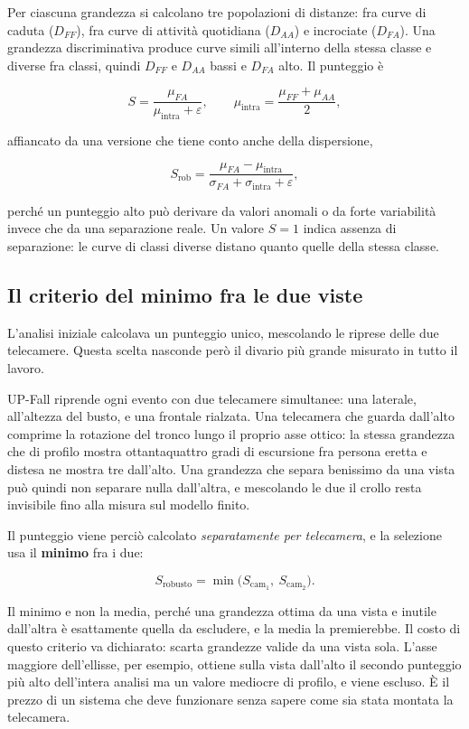 Per ciascuna grandezza si calcolano tre popolazioni di distanze: fra curve di
caduta ($D_{FF}$), fra curve di attività quotidiana ($D_{AA}$) e incrociate
($D_{FA}$). Una grandezza discriminativa produce curve simili all'interno della
stessa classe e diverse fra classi, quindi $D_{FF}$ e $D_{AA}$ bassi e $D_{FA}$
alto. Il punteggio è

\[
S = \frac{\mu_{FA}}{\mu_{\text{intra}} + \varepsilon},
\qquad
\mu_{\text{intra}} = \frac{\mu_{FF} + \mu_{AA}}{2},
\]

affiancato da una versione che tiene conto anche della dispersione,

\[
S_{\text{rob}} = \frac{\mu_{FA} - \mu_{\text{intra}}}
                      {\sigma_{FA} + \sigma_{\text{intra}} + \varepsilon},
\]

perché un punteggio alto può derivare da valori anomali o da forte variabilità
invece che da una separazione reale. Un valore $S = 1$ indica assenza di
separazione: le curve di classi diverse distano quanto quelle della stessa
classe.

\subsection{Il criterio del minimo fra le due viste}

L'analisi iniziale calcolava un punteggio unico, mescolando le riprese delle due
telecamere. Questa scelta nasconde però il divario più grande misurato in tutto
il lavoro.

UP-Fall riprende ogni evento con due telecamere simultanee: una laterale,
all'altezza del busto, e una frontale rialzata. Una telecamera che guarda
dall'alto comprime la rotazione del tronco lungo il proprio asse ottico: la
stessa grandezza che di profilo mostra ottantaquattro gradi di escursione fra
persona eretta e distesa ne mostra tre dall'alto. Una grandezza che separa
benissimo da una vista può quindi non separare nulla dall'altra, e mescolando le
due il crollo resta invisibile fino alla misura sul modello finito.

Il punteggio viene perciò calcolato \emph{separatamente per telecamera}, e la
selezione usa il \textbf{minimo} fra i due:

\[
S_{\text{robusto}} = \min\big(S_{\text{cam}_1},\ S_{\text{cam}_2}\big).
\]

Il minimo e non la media, perché una grandezza ottima da una vista e inutile
dall'altra è esattamente quella da escludere, e la media la premierebbe. Il
costo di questo criterio va dichiarato: scarta grandezze valide da una vista
sola. L'asse maggiore dell'ellisse, per esempio, ottiene sulla vista dall'alto
il secondo punteggio più alto dell'intera analisi ma un valore mediocre di
profilo, e viene escluso. È il prezzo di un sistema che deve funzionare senza
sapere come sia stata montata la telecamera.


